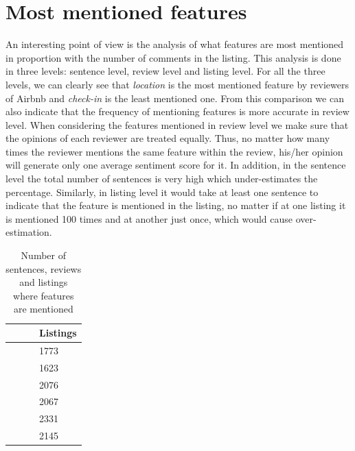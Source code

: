\section{Most mentioned features}
An interesting point of view is the analysis of what features are most mentioned in proportion with the number of comments in the listing. This analysis is done in three levels: sentence level, review level and listing level. For all the three levels, we can clearly see that \textit{location} is the most mentioned feature by reviewers of Airbnb and \textit{check-in} is the least mentioned one. From this comparison we can also indicate that the frequency of mentioning features is more accurate in review level. When considering the features mentioned in review level we make sure that the opinions of each reviewer are treated equally. Thus, no matter how many times the reviewer mentions the same feature within the review, his/her opinion will generate only one average sentiment score for it. In addition, in the sentence level the total number of sentences is very high which under-estimates the percentage. Similarly, in listing level it would take at least one sentence to indicate that the feature is mentioned in the listing, no matter if at one listing it is mentioned 100 times and at another just once, which would cause over-estimation.
\begin{table}[h!]
\footnotesize 
\centering
\begin{tabular}{|m{1.7cm}|m{2.4cm}|m{2.6cm}|m{1.15cm}|}

\hline
\centering {\textbf{}}  & \centering {\textbf{Sentences}} & \centering {\textbf{Reviews}} & {\textbf{Listings}} \\

\hline
\centering {Accuracy}  & \centering {8364} & \centering {7915} &  {1773} \\ \hline

 \centering {Check-in} & \centering {5818} & \centering  {5454} & {1623}\\ \hline
 
 \centering {Cleanliness} & \centering {18440} & \centering {17757} & {2076}\\ \hline
 
\centering  {Communication} & \centering {16894} & \centering {14610} & {2067} \\ \hline

\centering {Location} & \centering {69616} & \centering {44539} & {2331}\\ \hline

\centering {Value} & \centering {19862} & \centering {18811} & {2145}\\ \hline
\end{tabular}
\caption{Number of sentences, reviews and listings where features are mentioned}
\label{res1}
\end{table}

